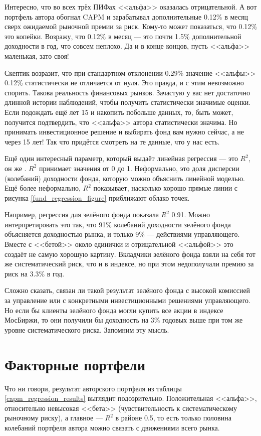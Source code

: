 Интересно, что во всех трёх ПИФах <<альфа>> оказалась отрицательной. А вот портфель автора обогнал CAPM и зарабатывал дополнительные 0.12\% в месяц сверх ожидаемой рыночной премии за риск. Кому-то может показаться, что 0.12\% это копейки. Возражу, что 0.12\% в месяц --- это почти 1.5\% дополнительной доходности в год, что совсем неплохо. Да и в конце концов, пусть <<альфа>> маленькая, зато своя!

Скептик возразит, что при стандартном отклонении 0.29\% значение <<альфы>> 0.12\% статистически не отличается от нуля. Это правда, и с этим невозможно спорить. Такова реальность финансовых рынков. Зачастую у вас нет достаточно длинной истории наблюдений, чтобы получить статистически значимые оценки. Если подождать ещё лет 15 и накопить побольше данных, то, быть может, получится подтвердить, что <<альфа>> автора статистически значима. Но принимать инвестиционное решение и выбирать фонд вам нужно сейчас, а не через 15 лет! Так что придётся смотреть на те данные, что у нас есть.

Ещё один интересный параметр, который выдаёт линейная регрессия --- это $R^2$, он же . $R^2$ принимает значения от 0 до 1. Неформально, это доля дисперсии (колебаний) доходности фонда, которую можно объяснить линейной моделью. Ещё более неформально, $R^2$ показывает, насколько хорошо прямые линии с рисунка \ref{fund_regression_figure} приближают облако точек.

Например, регрессия для зелёного фонда показала $R^2$ 0.91. Можно интерпретировать это так, что 91\% колебаний доходности зелёного фонда объясняется доходностью рынка, и только 9\% --- действиями управляющего. Вместе с <<бетой>> около единички и отрицательной <<альфой>> это создаёт не самую хорошую картину. Вкладчики зелёного фонда взяли на себя тот же систематический риск, что и в индексе, но при этом недополучали премию за риск на 3.3\% в год. 

Сложно сказать, связан ли такой результат зелёного фонда с высокой комиссией за управление или с конкретными инвестиционными решениями управляющего. Но если бы клиенты зелёного фонда могли купить все акции в индексе МосБиржи, то они получили бы доходность на 3\% годовых выше при том же уровне систематического риска. Запомним эту мысль.

\section{Факторные портфели}

Что ни говори, результат авторского портфеля из таблицы \ref{capm_regression_results} выглядит подозрительно. Положительная <<альфа>>, относительно невысокая <<бета>> (чувствительность к систематическому рыночному риску), а главное --- $R^2$ в районе 0.5, то есть только половина колебаний портфеля автора можно связать с движениями всего рынка.

